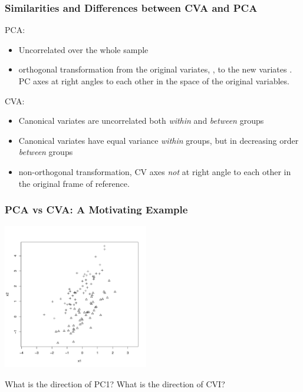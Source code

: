 \documentclass{beamer}
\begin{document}
\begin{frame}
  \frametitle{Similarities and Differences between CVA and PCA}

PCA:
\begin{itemize}
\item Uncorrelated over the whole sample
\item orthogonal transformation from the original variates, , to the new variates . PC axes at right angles to each other in the space of the original variables.
\end{itemize}

CVA:
\begin{itemize}
\item Canonical variates are uncorrelated both \emph{within} and \emph{between} groups
\item Canonical variates have equal variance \emph{within} groups, but in decreasing order \emph{between} groups
\item non-orthogonal transformation, CV axes \emph{not} at right angle to each other in the original frame of reference.
\end{itemize}
\end{frame}



\begin{frame}
  \frametitle{PCA vs CVA: A Motivating Example}

\begin{center}
\includegraphics[height=2.5in]{simple2group}

What is the direction of PC1? What is the direction of CVI?
\end{center}

\end{frame}
\end{document}
